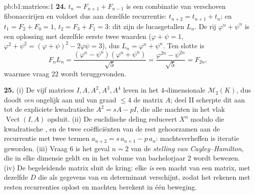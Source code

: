 \begin{solution}{pb:b1:matrices:1}
\textbf{24.} $t_n = F_{n+1} + F_{n-1}$ is een combinatie van
verschoven fibonaccirijen en voldoet dus aan dezelfde recurrentie:
$t_{n+2} = t_{n+1} + t_n$; en $t_1 = F_2 + F_0 = 1$, $t_2 = F_3 +
F_1 = 3$: dit zijn de lucasgetallen $L_n$. De rij $\varphi^n +
\psi^n$ is een oplossing met dezelfde eerste twee waarden ($\varphi
+ \psi = 1$, $\varphi^2 + \psi^2 = (\varphi + \psi)^2 -
2\varphi\psi = 3$), dus $L_n = \varphi^n + \psi^n$. Ten slotte is
\[
F_n L_n = \frac{(\varphi^n - \psi^n)(\varphi^n +
\psi^n)}{\sqrt5} = \frac{\varphi^{2n} - \psi^{2n}}{\sqrt5} =
F_{2n},
\]
waarmee vraag 22 wordt teruggevonden.

\textbf{25.} (i) De vijf matrices $I, A, A^2, A^3, A^4$ leven in
het $4$-dimensionale $\mathcal{M}_2(K)$, dus doodt \emph{een}
 ongelijk aan nul van graad $\leq 4$ de matrix $A$; deel
II scherpte dit aan tot de expliciete kwadratische $A^2 = sA -
pI$, die alle machten in het vlak $\operatorname{Vect}(I, A)$
opsluit. (ii) De euclidische deling reduceert $X^n$ modulo die
kwadratische , en de twee coëfficiënten van de rest
gehoorzamen aan de recurrentie met twee termen $a_{n+2} =
s\,a_{n+1} - p\,a_n$: machtsverheffen is iteratie geworden. (iii)
Vraag 6 is het geval $n = 2$ van de \emph{stelling van
Cayley--Hamilton}, die in elke dimensie geldt en in het volume van
bachelorjaar 2 wordt bewezen. (iv) De begeleidende matrix sluit de
kring: elke  \emph{is} een macht van een
matrix, met dezelfde  $D$ die als gegevens van  en
determinant verschijnt, zodat het rekenen met resten recurrenties
oplost en machten berekent in één beweging.
\end{solution}
